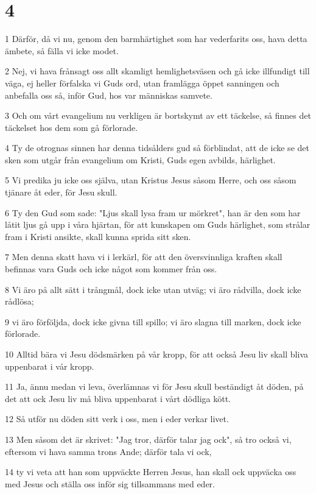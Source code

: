 \chapter{4}

\par 1 Därför, då vi nu, genom den barmhärtighet som har vederfarits oss, hava detta ämbete, så fälla vi icke modet.
\par 2 Nej, vi hava frånsagt oss allt skamligt hemlighetsväsen och gå icke illfundigt till väga, ej heller förfalska vi Guds ord, utan framlägga öppet sanningen och anbefalla oss så, inför Gud, hos var människas samvete.
\par 3 Och om vårt evangelium nu verkligen är bortskymt av ett täckelse, så finnes det täckelset hos dem som gå förlorade.
\par 4 Ty de otrognas sinnen har denna tidsålders gud så förblindat, att de icke se det sken som utgår från evangelium om Kristi, Guds egen avbilds, härlighet.
\par 5 Vi predika ju icke oss själva, utan Kristus Jesus såsom Herre, och oss såsom tjänare åt eder, för Jesu skull.
\par 6 Ty den Gud som sade: "Ljus skall lysa fram ur mörkret", han är den som har låtit ljus gå upp i våra hjärtan, för att kunskapen om Guds härlighet, som strålar fram i Kristi ansikte, skall kunna sprida sitt sken.
\par 7 Men denna skatt hava vi i lerkärl, för att den översvinnliga kraften skall befinnas vara Guds och icke något som kommer från oss.
\par 8 Vi äro på allt sätt i trångmål, dock icke utan utväg; vi äro rådvilla, dock icke rådlösa;
\par 9 vi äro förföljda, dock icke givna till spillo; vi äro slagna till marken, dock icke förlorade.
\par 10 Alltid bära vi Jesu dödsmärken på vår kropp, för att också Jesu liv skall bliva uppenbarat i vår kropp.
\par 11 Ja, ännu medan vi leva, överlämnas vi för Jesu skull beständigt åt döden, på det att ock Jesu liv må bliva uppenbarat i vårt dödliga kött.
\par 12 Så utför nu döden sitt verk i oss, men i eder verkar livet.
\par 13 Men såsom det är skrivet: "Jag tror, därför talar jag ock", så tro också vi, eftersom vi hava samma trons Ande; därför tala vi ock,
\par 14 ty vi veta att han som uppväckte Herren Jesus, han skall ock uppväcka oss med Jesus och ställa oss inför sig tillsammans med eder.
